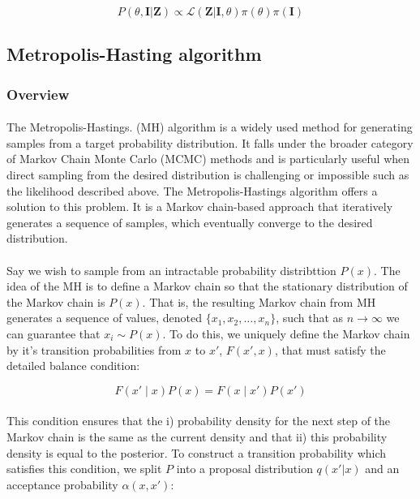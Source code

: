 \begin{equation}
\label{eq:bayes}
P(\theta, \mathbf{I} | \mathbf{Z}) \propto \mathcal{L}(\mathbf{Z} | \mathbf{I}, \theta)\pi(\theta)\pi(\mathbf{I})
\end{equation}


\subsection{Metropolis-Hasting algorithm}

\subsubsection{Overview}
\paragraph{} The Metropolis-Hastings. (MH) algorithm is a widely used method for generating samples from a target probability distribution. It falls under the broader category of Markov Chain Monte Carlo (MCMC) methods and is particularly useful when direct sampling from the desired distribution is challenging or impossible such as the likelihood described above. The Metropolis-Hastings algorithm offers a solution to this problem. It is a Markov chain-based approach that iteratively generates a sequence of samples, which eventually converge to the desired distribution. 

\paragraph{}Say we wish to sample from an intractable probability distribttion $P(x)$. The idea of the MH is to define a Markov chain so that the stationary distribution of the Markov chain is $P(x)$. That is, the resulting Markov chain from MH generates a sequence of values, denoted $\{x_1, x_2, \dots,  x_n\}$, such that as $n \rightarrow \infty$ we can guarantee that $x_i \sim P(x)$. To do this, we uniquely define the Markov chain by it's transition probabilities from $x$ to $x'$, $F(x', x)$, that must satisfy the detailed balance condition:

\begin{equation}
\label{eq:db}
F(x' \mid x)P(x)=  F(x\mid x')P(x')
\end{equation}

\paragraph{}This condition ensures that the i) probability density for the next step of the Markov chain is the same as the current density and that ii) this probability density is equal to the posterior.  To construct a transition probability which satisfies this condition, we split $P$ into a proposal distribution $q(x' | x)$ and an acceptance probability $\alpha(x, x')$:

